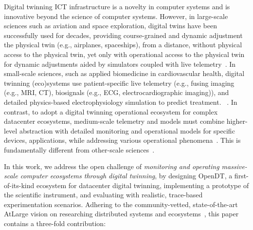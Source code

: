 Digital twinning ICT infrastructure is a novelty in computer systems and is innovative beyond the science of computer systems. However, in large-scale sciences such as aviation and space exploration, digital twins have been successfully used for decades, providing course-grained and dynamic adjustment the physical twin (e.g., airplanes, spaceships), from a distance, without physical access to the physical twin, yet only with operational access to the physical twin for dynamic adjustments aided by simulators coupled with live telemetry~. In small-scale sciences, such as applied biomedicine in cardiovascular health, digital twinning (eco)systems use patient-specific live telemetry (e.g., fusing imaging (e.g., MRI, CT), biosignals (e.g., ECG, electrocardiographic imaging)), and detailed physics-based electrophysiology simulation to predict treatment. ~\cite{sel2024building}. In contrast, to adopt a digital twinning operational ecosystem for complex datacenter ecosystems, medium-scale telemetry and models must combine higher-level abstraction with detailed monitoring and operational models for specific devices, applications, while addressing various operational phenomena~\cite{nicolae5377101m3sa}. This is fundamentally different from other-scale sciences~\cite{allen2019hierarchy, nicolae5377101m3sa}.

In this work, we address the open challenge of \textit{monitoring and operating massive-scale computer ecosystems through digital twinning}, by designing OpenDT, a first-of-its-kind ecosystem for datacenter digital twinning, implementing a prototype of the scientific instrument, and evaluating with realistic, trace-based experimentation scenarios. Adhering to the community-vetted, state-of-the-art AtLarge vision on researching distributed systems and ecosystems~\cite{iosup2019atlarge}, this paper contains a three-fold contribution:



